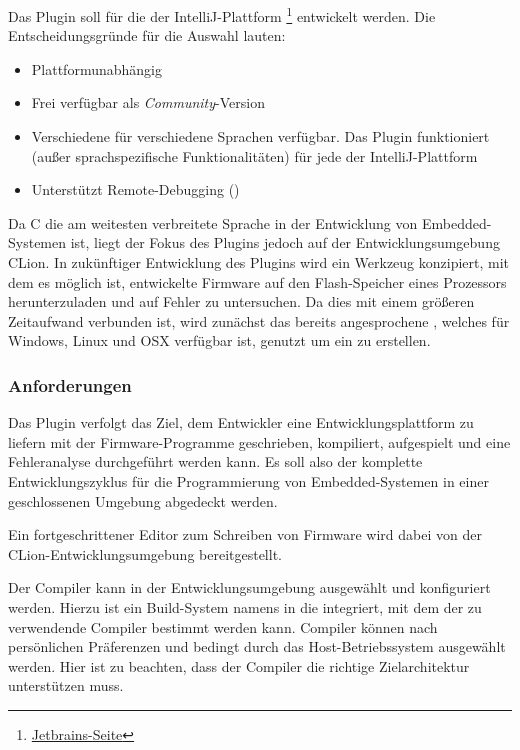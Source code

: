     Das Plugin soll für die  der IntelliJ-Plattform
    \footnote{\href{https://www.jetbrains.com/}{Jetbrains-Seite}} entwickelt werden. Die Entscheidungsgründe für die
    Auswahl lauten:
    \begin{itemize}
        \item Plattformunabhängig
        \item Frei verfügbar als \textit{Community}-Version
        \item Verschiedene  für verschiedene Sprachen verfügbar. Das Plugin funktioniert
        (außer sprachspezifische Funktionalitäten) für jede  der IntelliJ-Plattform
        \item Unterstützt Remote-Debugging ()
    \end{itemize}

    Da C die am weitesten verbreitete Sprache in der Entwicklung von Embedded-Systemen ist, liegt der Fokus des Plugins
    jedoch auf der Entwicklungsumgebung CLion.
    In zukünftiger Entwicklung des Plugins wird ein Werkzeug konzipiert, mit dem es möglich ist, entwickelte Firmware auf
    den Flash-Speicher eines Prozessors herunterzuladen und auf Fehler zu untersuchen. Da dies mit einem größeren
    Zeitaufwand verbunden ist, wird zunächst das bereits angesprochene , welches für Windows, Linux
    und OSX verfügbar ist, genutzt um ein  zu erstellen.
        \subsubsection{Anforderungen}
        \label{sec:pluginrequirements}
        Das Plugin verfolgt das Ziel, dem Entwickler eine Entwicklungsplattform zu liefern mit der Firmware-Programme
        geschrieben, kompiliert, aufgespielt und eine Fehleranalyse durchgeführt werden kann. Es soll also der komplette
        Entwicklungszyklus für die Programmierung von Embedded-Systemen in einer geschlossenen Umgebung abgedeckt
        werden.

        Ein fortgeschrittener Editor zum Schreiben von Firmware wird dabei von der CLion-Entwicklungsumgebung
        bereitgestellt.

        Der Compiler kann in der Entwicklungsumgebung ausgewählt und konfiguriert werden. Hierzu ist ein Build-System
        namens  in die  integriert, mit dem der zu verwendende Compiler bestimmt werden kann. Compiler können
        nach persönlichen Präferenzen und bedingt durch das Host-Betriebssystem ausgewählt werden. Hier ist zu beachten,
        dass der Compiler die richtige Zielarchitektur unterstützen muss.

